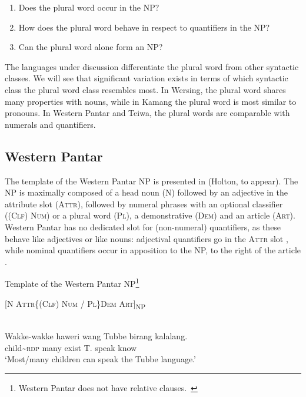 \begin{enumerate}
\item Does the plural word occur in the NP?
\item  How does the plural word behave in respect to quantifiers in the NP?
\item   Can the plural word alone form an NP?
\end{enumerate}

The languages under discussion differentiate the plural word from other syntactic classes. We will see that significant variation exists in terms of which syntactic class the plural word class resembles most. In Wersing, the plural word shares many properties with nouns, while in Kamang the plural word is most similar to pronouns. In Western Pantar and Teiwa, the plural words are comparable with numerals and quantifiers.

\subsection{Western Pantar}  %
\label{sec:9:3.1}
The template of the Western Pantar NP is presented in  (Holton, to appear). The NP is maximally composed of a head noun (N) followed by an adjective in the attribute slot (\textsc{Attr),} followed by numeral phrases with an optional classifier (\textsc{(Clf)} \textsc{Num)} or a plural word (\textsc{Pl),} a demonstrative \textsc{(Dem)} and an article \textsc{(Art)}. Western Pantar has no dedicated slot for (non-numeral) quantifiers, as these behave like adjectives or like nouns: adjectival quantifiers go in the A\textsc{ttr} slot , while nominal quantifiers occur in apposition to the NP, to the right of the article .

\ea\label{ex:9:12}
Template of the Western Pantar NP\footnote{  Western Pantar does not have relative clauses.~}

 [\textsc{N  Attr\{(Clf) Num / Pl\}Dem  Art]}\textsc{\textsubscript{NP}}
 
\z


\ea%
\label{ex:9:13}
 \\
\gll  Wakke-wakke haweri wang Tubbe birang kalalang. \\
   child\~{}\textsc{rdp} many exist T. speak know  \\
\glt `Most/many children can speak the Tubbe language.'
\z







